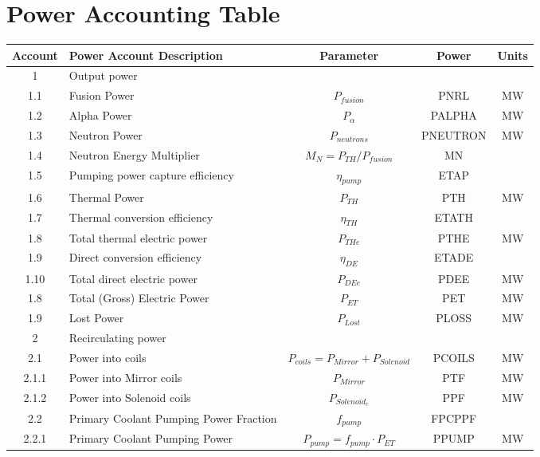 \newpage
\section{Power Accounting Table}

\begin{table}[ht!]								
\centering								
\begin{tabular}{|c|p{5cm}|c|c|c|}								
\hline								
\textbf{Account}	&	\textbf{Power Account Description}	&	\textbf{Parameter }	&	\textbf{Power}	&	\textbf{Units} \\
\hline								
1	&	Output power	&		&		&	\\
\hline
1.1	&	Fusion Power	&	$P_{{fusion}}$	&	PNRL	&	MW \\
1.2	&	Alpha Power	&	$P_{{\alpha}}$	&	PALPHA	&	MW \\
1.3	&	Neutron Power	&	$P_{{neutrons}}$	&	PNEUTRON	&	MW \\
1.4	&	Neutron Energy Multiplier	&	$M_N = P_{{TH}}/P_{{fusion}}$	&	MN	&	\\
1.5	&	Pumping power capture efficiency	&	$\eta_{{pump}}$	&	ETAP	&	\\
1.6	&	Thermal Power	&	$P_{{TH}}$	&	PTH	&	MW \\
1.7	&	Thermal conversion efficiency	&	$\eta_{{TH}}$	&	ETATH	&	\\
1.8	& Total thermal electric power &	$P_{THe}$ &	PTHE	& MW \\
1.9	& Direct conversion efficiency &	$\eta_{DE}$ &	ETADE & \\	
1.10 &	Total direct electric power	& $P_{DEe}$	& PDEE & MW \\ 
1.8	&	Total (Gross) Electric Power	&	$P_{{ET}}$	&	PET	&	MW \\
1.9	&	Lost Power	&	$P_{{Lost}}$	&	PLOSS	&	MW \\
\hline								
2	&	Recirculating power	&		&		&	\\
\hline
2.1	&	Power into coils 	&	$P_{{coils}} = P_{{Mirror}} + P_{{Solenoid}}$	&	PCOILS	&	MW \\
2.1.1	&	Power into Mirror coils	&	$P_{{Mirror}}$	&	PTF	&	MW \\
2.1.2	&	Power into Solenoid coils	&	$P_{{Solenoid}_e}$	&	PPF		&	MW \\
2.2	&	Primary Coolant Pumping Power Fraction	&	$f_{{pump}}$	&	FPCPPF &	\\
2.2.1	&	Primary Coolant Pumping Power	&	$P_{{pump}} = f_{{pump}} \cdot P_{{ET}}$	&	PPUMP	&	MW \\

\end{tabular}
\end{table}
